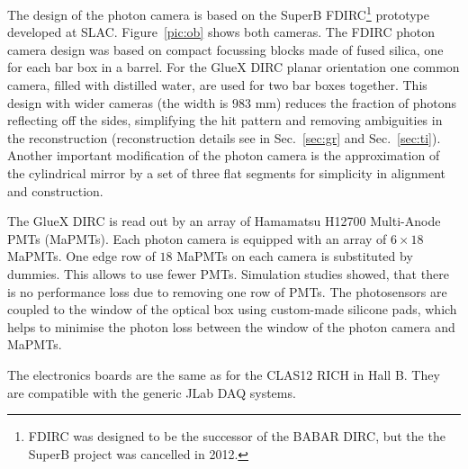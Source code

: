 The design of the photon camera is based on the SuperB FDIRC\footnote{FDIRC was designed to be the successor of the BABAR DIRC, but the the SuperB project was cancelled in 2012.} prototype~\cite{fdirc} developed at SLAC. Figure~\ref{pic:ob} shows both cameras. The FDIRC photon camera design was based on compact focussing blocks made of fused silica, one for each bar box in a barrel. For the GlueX DIRC planar orientation one common camera, filled with distilled water, are used for two bar boxes together. This design with wider cameras (the width is $983$ mm) reduces the fraction of photons reflecting off the sides, simplifying the hit pattern and removing ambiguities in the reconstruction (reconstruction details see in Sec.~\ref{sec:gr} and Sec.~\ref{sec:ti}). Another important modification of the photon camera is the approximation of the cylindrical mirror by a set of three flat segments for simplicity in alignment and construction. 

The GlueX DIRC is read out by an array of Hamamatsu H12700 Multi-Anode PMTs (MaPMTs). Each photon camera is equipped with an array of $6 \times 18$ MaPMTs. One edge row of $18$ MaPMTs on each camera is substituted by dummies. This allows to use fewer PMTs. Simulation studies showed, that there is no performance loss due to removing one row of PMTs. The photosensors are coupled to the window of the optical box using custom-made silicone pads, which helps to minimise the photon loss between the window of the photon camera and MaPMTs. 

The electronics boards are the same as for the CLAS12 RICH in Hall B. They are compatible with the generic JLab DAQ systems.
